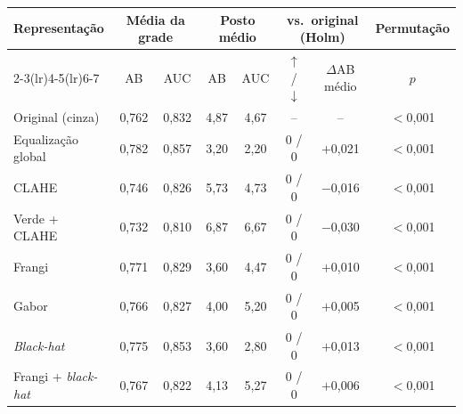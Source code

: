 \begin{tabular}{lccccccc}
\toprule
\multirow{2}{*}{Representação} & \multicolumn{2}{c}{Média da grade} & \multicolumn{2}{c}{Posto médio} & \multicolumn{2}{c}{vs.\ original (Holm)} & Permutação \\
\cmidrule(lr){2-3}\cmidrule(lr){4-5}\cmidrule(lr){6-7}
 & AB & AUC & AB & AUC & $\uparrow$ / $\downarrow$ & $\Delta$AB médio & $p$ \\
\midrule
Original (cinza) & 0,762 & 0,832 & 4,87 & 4,67 & -- & -- & $<$0,001 \\
Equalização global & 0,782 & 0,857 & 3,20 & 2,20 & 0 / 0 & $+$0,021 & $<$0,001 \\
CLAHE & 0,746 & 0,826 & 5,73 & 4,73 & 0 / 0 & $-$0,016 & $<$0,001 \\
Verde + CLAHE & 0,732 & 0,810 & 6,87 & 6,67 & 0 / 0 & $-$0,030 & $<$0,001 \\
\midrule
Frangi & 0,771 & 0,829 & 3,60 & 4,47 & 0 / 0 & $+$0,010 & $<$0,001 \\
Gabor & 0,766 & 0,827 & 4,00 & 5,20 & 0 / 0 & $+$0,005 & $<$0,001 \\
\textit{Black-hat} & 0,775 & 0,853 & 3,60 & 2,80 & 0 / 0 & $+$0,013 & $<$0,001 \\
Frangi + \textit{black-hat} & 0,767 & 0,822 & 4,13 & 5,27 & 0 / 0 & $+$0,006 & $<$0,001 \\
\bottomrule
\end{tabular}
